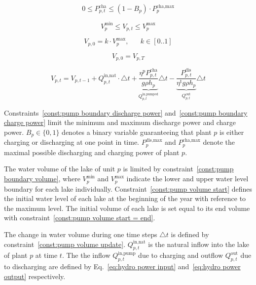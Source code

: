 \begin{equation}\label{const:pump boundary charge power}
    0 \leq P^{\text{cha}}_{p, t} \leq (1-B_p) \cdot P^{\text{cha,max}}_{p}
\end{equation}

\begin{equation}\label{const:pump boundary volume}
    V^{\text{min}}_{p} \leq V_{p, t} \leq V^{\text{max}}_{p}
\end{equation}

\begin{equation}\label{const:pump volume start}
    V_{p, 0} = k \cdot V^{\text{max}}_{p},  \,\,\,\,\,\,\,\,\,\,     k \in [0..1]
\end{equation}

\begin{equation}\label{const:pump volume start = end}
    V_{p, 0} = V_{p, T}
\end{equation}

\setlength{\belowdisplayskip}{12pt}
\begin{equation}\label{const:pump volume update}
    V_{p, t} = V_{p, t-1} 
    + Q^{\text{in,nat}}_{p,t} \cdot \triangle t 
    + \underbrace{\frac{\eta^{\text{p}} P^{\text{cha}}_{p, t}}{g \rho h_p}}_{Q^{\text{in,pumped}}_{p,t}} \triangle t
    - \underbrace{\frac{P^{\text{dis}}_{p, t}}{\eta^{\text{t}} g \rho h_p}}_{Q^{\text{out}}_{p,t}} \triangle t
\end{equation}

\noindent Constraints~\eqref{const:pump boundary discharge power} and~\eqref{const:pump boundary charge power} limit the minimum and maximum discharge power and charge power. $B_p \in \{0,1\}$ denotes a binary variable guaranteeing that plant $p$ is either charging or discharging at one point in time. $P^{\text{dis,max}}_{p}$ and $P^{\text{cha,max}}_{p}$ denote the maximal possible discharging and charging power of plant $p$.

\noindent The water volume of the lake of unit $p$ is limited by constraint~\eqref{const:pump boundary volume}, where $V^{\text{min}}_{p}$ and $V^{\text{max}}_{p}$ indicate the lower and upper water level boundary for each lake individually. Constraint~\eqref{const:pump volume start}  defines the initial water level of each lake at the beginning of the year with reference to the maximum level. The initial volume of each lake is set equal to its end volume with constraint~\eqref{const:pump volume start = end}. 

\noindent The change in water volume during one time steps $\triangle t$ is defined by constraint~\eqref{const:pump volume update}. $Q^{\text{in,nat}}_{p,t}$ is the natural inflow into the lake of plant $p$ at time $t$. The the inflow $Q^{\text{in,pump}}_{p,t}$ due to charging and outflow $Q^{\text{out}}_{p,t}$ due to discharging are defined by Eq.~\eqref{eq:hydro power input} and~\eqref{eq:hydro power output} respectively. 


